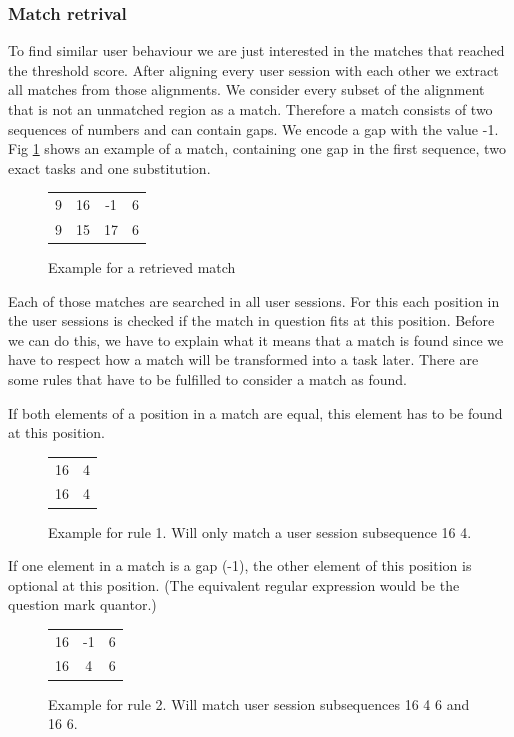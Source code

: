 \subsubsection{Match retrival}
To find similar user behaviour we are just interested in the matches that reached the threshold score. After aligning every user session with each other we extract all matches from those alignments.
We consider every subset of the alignment that is not an unmatched region as a match.
Therefore a match consists of two sequences of numbers and can contain gaps. We encode a gap with the value -1. 
Fig \ref{fig:matchexample} shows an example of a match, containing one gap in the first sequence, two exact tasks and one substitution.

\begin{figure}[h]
	\centering
	\begin{tabular}{cccc}
		9 & 16 & -1 & 6 \\
		9 & 15 & 17 & 6  
	\end{tabular}
	\caption{Example for a retrieved match}
	\label{fig:matchexample}
\end{figure}
Each of those matches are searched in all user sessions. For this each position in the user sessions is checked if the match in question fits at this position.
Before we can do this, we have to explain what it means that a match is found since we have to respect how a match will be transformed into a task later.
There are some rules that have to be fulfilled to consider a match as found. 

	\begin{rules}
		\item If both elements of a position in a match are equal, this element has to be found at this position. 
	\end{rules}
	\begin{figure}[h]
		\centering
			\begin{tabular}{cc}
				 16 & 4\\
				 16 & 4\\  
			\end{tabular}
		\caption{Example for rule 1. Will only match a user session subsequence 16 4.}
		\label{fig:rule1}
	\end{figure}
	

	\begin{rules}
		\item If one element in a match is a gap (-1), the other element of this position is optional at this position. (The equivalent regular expression would be the question mark quantor.)
	\end{rules}
	\begin{figure}[h]
		\centering
			\begin{tabular}{ccc}
				16 & -1 &6\\
				16 &  4 & 6\\  
			\end{tabular}
			\caption{Example for rule 2. Will match user session subsequences 16 4 6 and 16 6.}
		\label{fig:rule2}
	\end{figure}
	
